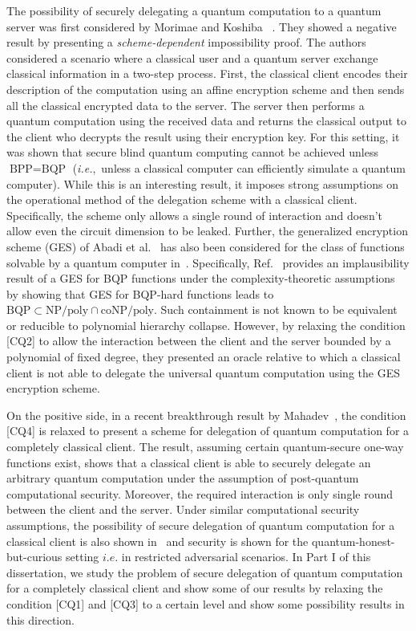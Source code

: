 The possibility of securely delegating a quantum computation to a quantum server was first considered by Morimae and Koshiba ~\cite{morimae2014impossibility}.  They showed a negative result by presenting a  \emph{scheme-dependent} impossibility proof.  The authors considered a scenario where a classical user and a quantum server exchange classical information in a two-step process. First, the classical client encodes their description of the computation using an affine encryption scheme and then sends all the classical encrypted data to the server. The server then performs a quantum computation using the received data and returns the classical output to the client who decrypts the result using their encryption key. For this setting, it was shown that secure blind quantum computing cannot be achieved unless $\text{BPP} = \text{BQP}$ (\textit{i.e.},~unless a classical computer can efficiently simulate a quantum computer). While this is an interesting result, it imposes strong assumptions on the operational method of the delegation scheme with a classical client. Specifically, the scheme only allows a single round of interaction and doesn't allow even the circuit dimension to be leaked. Further, the generalized encryption scheme (GES) of Abadi et al.~\cite{abadi1987hiding} has also been considered for the class of functions solvable by a quantum computer in~\cite{dunjko2016blind, aaronson2017implausibility}. Specifically, Ref.~\cite{aaronson2017implausibility} provides an implausibility result of a GES for BQP functions under the complexity-theoretic assumptions by showing that GES for BQP-hard functions leads to $\text{BQP} \subset \text{NP/poly} \cap \text{coNP/poly}$. Such containment is not known to be equivalent or reducible to polynomial hierarchy collapse. However, by relaxing the condition [CQ2] to allow the interaction between the client and the server bounded by a polynomial of fixed degree, they presented an oracle relative to which a classical client is not able to delegate the universal quantum computation using the GES encryption scheme.

On the positive side, in a recent breakthrough result by Mahadev~\cite{mahadev2017classical}, the condition [CQ4] is relaxed to present a scheme for delegation of quantum computation for a completely classical client. The result, assuming certain quantum-secure one-way functions exist, shows that a classical client is able to securely delegate an arbitrary quantum computation under the assumption of post-quantum computational security. Moreover, the required interaction is only single round between the client and the server. Under similar computational security assumptions, the possibility of secure delegation of quantum computation for a classical client is also shown in~\cite{cojocaru2018delegated} and security is shown for the quantum-honest-but-curious setting $\textit{i.e.}$ in restricted adversarial scenarios.  In Part I of this dissertation, we study the problem of secure delegation of quantum computation for a completely classical client and show some of our results by relaxing the condition [CQ1] and [CQ3] to a certain level and show some possibility results in this direction.  

